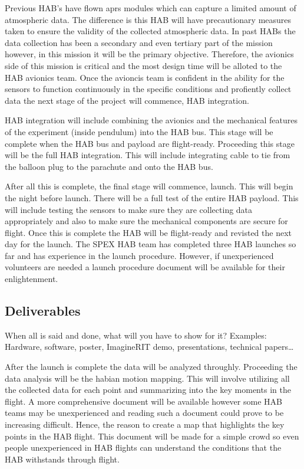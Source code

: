 \documentclass[journal]{SPEXformat}
\newenvironment{help}{
  \ttfamily\footnotesize\sloppy
  \begin{lrbox}{\helpbox}\begin{minipage}{\linewidth}
  }{
  \end{minipage}\end{lrbox}
  \ifbool{showhelp}{
    \fbox{\usebox{\helpbox}}
  }{}
}
\begin{document}
  Previous HAB's have flown aprs modules which can capture a limited amount of atmospheric
  data. The difference is this HAB will have precautionary measures taken to ensure the validity of the collected atmospheric data.
  In past HABs the data collection has been a secondary and even tertiary part of the mission however, in this mission it will be
  the primary objective. Therefore, the avionics side of this mission is critical and the most design time will be alloted to the
  HAB avionics team. Once the avioncis team is confident in the ability for the sensors to function continuously in the specific conditions and
  profiently collect data the next stage of the project will commence, HAB integration.

  HAB integration will include combining the avionics and the mechanical features of the experiment (inside pendulum) into the HAB
  bus. This stage will be complete when the HAB bus and payload are flight-ready. Proceeding this stage will be the full HAB integration.
  This will include integrating cable to tie from the balloon plug to the parachute and onto the HAB bus.

  After all this is complete, the final stage will commence, launch. This will begin the night before launch. There will
  be a full test of the entire HAB payload. This will include testing the sensors to make sure they are collecting data appropriately and
  also to make sure the mechanical components are secure for flight. Once this is complete the HAB will be flight-ready and revisted the
  next day for the launch. The SPEX HAB team has completed three HAB launches so far and has experience in the launch procedure. However,
  if unexperienced volunteers are needed a launch procedure document will be available for their enlightenment.

\subsection{Deliverables}
\label{subsec:deliverables}
\begin{help}
  When all is said and done, what will you have to show for it?
  Examples: Hardware, software, poster, ImagineRIT demo, presentations, technical papers\ldots
\end{help}
  After the launch is complete the data will be analyzed throughly. Proceeding the data analysis will be the habian motion mapping.
  This will involve utilizing all the collected data for each point and summarizing into the key moments in the flight. A more comprehensive
  document will be available however some HAB teams may be unexperienced and reading such a document could prove to be increasing difficult.
  Hence, the reason to create a map that highlights the key points in the HAB flight. This document will be made for a simple crowd so even
  people unexperienced in HAB flights can understand the conditions that the HAB withstands through flight.
\end{document}
